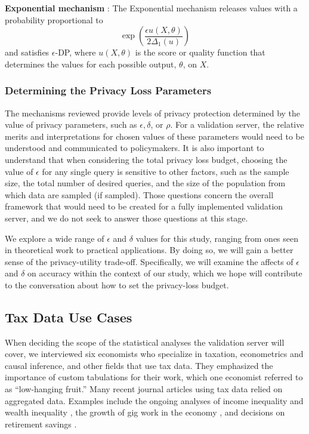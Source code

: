  \begin{defn}\label{def:exp} \textbf{Exponential mechanism} \citep{mcsherry2007mechanism}:
     The Exponential mechanism releases values with a probability proportional to
         \begin{equation}\label{eqn:exp}
             \exp \left(\frac{\epsilon u(X, \theta)}{2\Delta_1(u)}\right)
         \end{equation}
     and satisfies $\epsilon$-DP, where $u(X,\theta)$ is the score or quality function that determines the values for each possible output, $\theta$, on $X$.
 \end{defn}
\vspace{-8pt}
\subsubsection{Determining the Privacy Loss Parameters}
The mechanisms reviewed provide levels of privacy protection determined by the value of privacy parameters, such as $\epsilon, \delta$, or $\rho$. For a validation server, the relative merits and interpretations for chosen values of these parameters would need to be understood and communicated to policymakers. It is also important to understand that when considering the total privacy loss budget, choosing the value of $\epsilon$ for any single query is sensitive to other factors, such as the sample size, the total number of desired queries, and the size of the population from which data are sampled (if sampled). Those questions concern the overall framework that would need to be created for a fully implemented validation server, and we do not seek to answer those questions at this stage.

We explore a wide range of $\epsilon$ and $\delta$ values for this study, ranging from ones seen in theoretical work to practical applications. By doing so, we will gain a better sense of the privacy-utility trade-off. Specifically, we will examine the affects of $\epsilon$ and $\delta$ on accuracy within the context of our study, which we hope will contribute to the conversation about how to set the privacy-loss budget.

\subsection{Tax Data Use Cases}\label{subsec:data}
When deciding the scope of the statistical analyses the validation server will cover, we interviewed six economists who specialize in taxation, econometrics and causal inference, and other fields that use tax data. They emphasized the importance of custom tabulations for their work, which one economist referred to as ``low-hanging fruit.'' Many recent journal articles using tax data relied on aggregated data. Examples include the ongoing analyses of income inequality \citep{auten2018income} and wealth inequality \citep{smith2019top}, the growth of gig work in the economy \citep{collins2019gig}, and decisions on retirement savings \citep{brady2020reconciling}.

